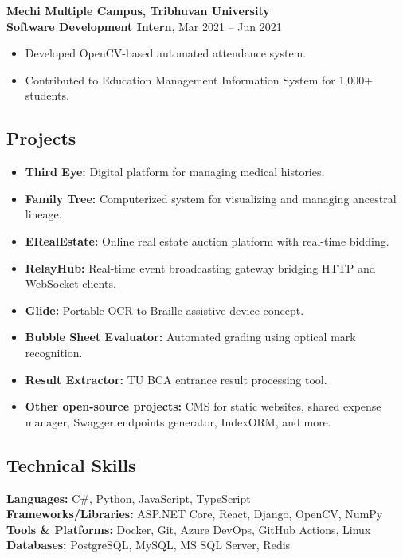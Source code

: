 \textbf{Mechi Multiple Campus, Tribhuvan University}\\
\textbf{Software Development Intern}, Mar 2021 -- Jun 2021

\begin{itemize}
\tightlist
\item
  Developed OpenCV-based automated attendance system.
\item
  Contributed to Education Management Information System for 1,000+
  students.
\end{itemize}

\hypertarget{projects}{%
\subsection{\texorpdfstring{\textbf{Projects}}{Projects}}\label{projects}}

\begin{itemize}
\tightlist
\item
  \textbf{Third Eye:} Digital platform for managing medical histories.
\item
  \textbf{Family Tree:} Computerized system for visualizing and managing
  ancestral lineage.
\item
  \textbf{ERealEstate:} Online real estate auction platform with
  real-time bidding.
\item
  \textbf{RelayHub:} Real-time event broadcasting gateway bridging HTTP
  and WebSocket clients.
\item
  \textbf{Glide:} Portable OCR-to-Braille assistive device concept.
\item
  \textbf{Bubble Sheet Evaluator:} Automated grading using optical mark
  recognition.
\item
  \textbf{Result Extractor:} TU BCA entrance result processing tool.
\item
  \textbf{Other open-source projects:} CMS for static websites, shared
  expense manager, Swagger endpoints generator, IndexORM, and more.
\end{itemize}

\hypertarget{technical-skills}{%
\subsection{\texorpdfstring{\textbf{Technical
Skills}}{Technical Skills}}\label{technical-skills}}

\textbf{Languages:} C\#, Python, JavaScript, TypeScript\\
\textbf{Frameworks/Libraries:} ASP.NET Core, React, Django, OpenCV,
NumPy\\
\textbf{Tools \& Platforms:} Docker, Git, Azure DevOps, GitHub Actions,
Linux\\
\textbf{Databases:} PostgreSQL, MySQL, MS SQL Server, Redis

